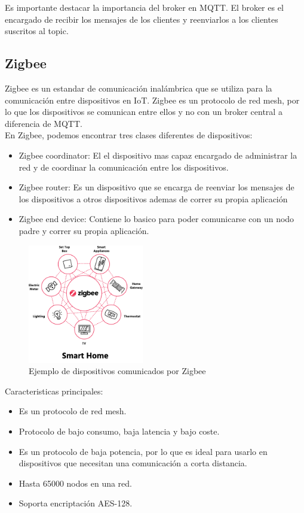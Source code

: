 \begin{titlepage}
Es importante destacar la importancia del broker en MQTT. El broker es el encargado de recibir los mensajes de los clientes y reenviarlos a los clientes suscritos al topic. \\

\subsection{Zigbee}
Zigbee\cite{ref15} es un estandar de comunicación inalámbrica que se utiliza para la comunicación entre dispositivos en IoT. Zigbee es un protocolo de red mesh, por lo que los dispositivos se comunican entre ellos y no con un broker central a diferencia de MQTT.\\

En Zigbee, podemos encontrar tres clases diferentes de dispositivos:
\begin{itemize}
	\item Zigbee coordinator: El el dispositivo mas capaz encargado de administrar la red y de coordinar la comunicación entre los dispositivos.
	\item Zigbee router: Es un dispositivo que se encarga de reenviar los mensajes de los dispositivos a otros dispositivos ademas de correr su propia aplicación
	\item Zigbee end device: Contiene lo basico para poder comunicarse con un nodo padre y correr su propia aplicación.
\end{itemize}
\begin{figure}[h!]
	\centering
	\includegraphics[width=0.45\textwidth]{imagenes/zigbee.png}
	\caption{Ejemplo de dispositivos comunicados por Zigbee\cite{zigbee_img}}
\end{figure}
Caracteristicas principales:
\begin{itemize}
	\item Es un protocolo de red mesh.
	\item Protocolo de bajo consumo, baja latencia y bajo coste.
	\item Es un protocolo de baja potencia, por lo que es ideal para usarlo en dispositivos que necesitan una comunicación a corta distancia.
	\item Hasta 65000 nodos en una red.
	\item Soporta encriptación AES-128.
\end{itemize}
\end{titlepage}
